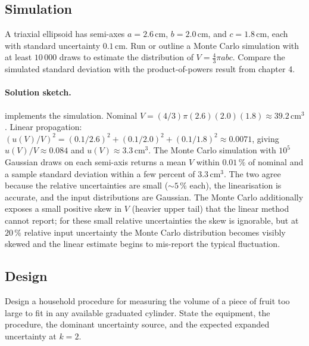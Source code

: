 \subsection*{Simulation}

\begin{exercise}
A triaxial ellipsoid has semi-axes $a = 2.6 \,\si{\centi\meter}$,
$b = 2.0 \,\si{\centi\meter}$, and $c = 1.8 \,\si{\centi\meter}$,
each with standard uncertainty $0.1 \,\si{\centi\meter}$. Run or
outline a Monte Carlo simulation with at least $10\,000$ draws to
estimate the distribution of $V = \tfrac{4}{3}\pi a b c$. Compare
the simulated standard deviation with the product-of-powers result
from chapter 4.
\end{exercise}

\paragraph{Solution sketch.}
implements the simulation. Nominal $V = (4/3)\pi (2.6)(2.0)(1.8)
\approx 39.2 \,\si{\centi\meter\cubed}$. Linear propagation:
$(u(V)/V)^{2} = (0.1/2.6)^{2} + (0.1/2.0)^{2} + (0.1/1.8)^{2}
\approx 0.0071$, giving $u(V)/V \approx 0.084$ and $u(V) \approx
3.3 \,\si{\centi\meter\cubed}$. The Monte Carlo simulation with
$10^{5}$ Gaussian draws on each semi-axis returns a mean $V$
within $0.01\,\%$ of nominal and a sample standard deviation
within a few percent of $3.3 \,\si{\centi\meter\cubed}$. The two
agree because the relative uncertainties are small ($\sim 5\,\%$
each), the linearisation is accurate, and the input distributions
are Gaussian. The Monte Carlo additionally exposes a small
positive skew in $V$ (heavier upper tail) that the linear method
cannot report; for these small relative uncertainties the skew is
ignorable, but at $20\,\%$ relative input uncertainty the
Monte Carlo distribution becomes visibly skewed and the linear
estimate begins to mis-report the typical fluctuation.

\subsection*{Design}

\begin{exercise}
Design a household procedure for measuring the volume of a piece of
fruit too large to fit in any available graduated cylinder. State
the equipment, the procedure, the dominant uncertainty source, and
the expected expanded uncertainty at $k = 2$.
\end{exercise}

